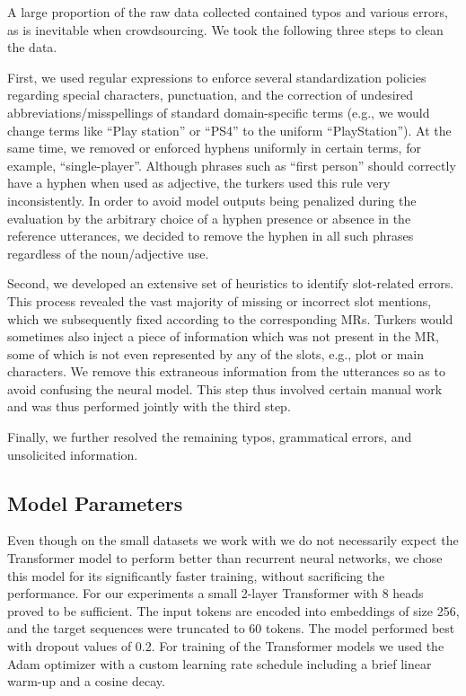 \documentclass[11pt,a4paper]{article}
\begin{document}
A large proportion of the raw data collected contained typos and various errors, as is inevitable when crowdsourcing. We took the following three steps to clean the data.

First, we used regular expressions to enforce several standardization policies regarding special characters, punctuation, and the correction of undesired abbreviations/misspellings of standard domain-specific terms (e.g., we would change terms like ``Play station'' or ``PS4'' to the uniform ``PlayStation''). At the same time, we removed or enforced hyphens uniformly in certain terms, for example, ``single-player''. Although phrases such as ``first person'' should correctly have a hyphen when used as adjective, the turkers used this rule very inconsistently. In order to avoid model outputs being penalized during the evaluation by the arbitrary choice of a hyphen presence or absence in the reference utterances, we decided to remove the hyphen in all such phrases regardless of the noun/adjective use.


Second, we developed an extensive set of heuristics to identify slot-related errors. This process revealed the vast majority of missing or incorrect slot mentions, which we subsequently fixed according to the corresponding MRs. Turkers would sometimes also inject a piece of information which was not present in the MR, some of which is not even represented by any of the slots, e.g., plot or main characters. We remove this extraneous information from the utterances so as to avoid confusing the neural model. This step thus involved certain manual work and was thus performed jointly with the third step.

Finally, we further resolved the remaining typos, grammatical errors, and unsolicited information.












\subsection{Model Parameters}

Even though on the small datasets we work with we do not necessarily expect the Transformer model to perform better than recurrent neural networks, we chose this model for its significantly faster training, without sacrificing the performance. For our experiments a small 2-layer Transformer with 8 heads proved to be sufficient. The input tokens are encoded into embeddings of size 256, and the target sequences were truncated to 60 tokens. The model performed best with dropout values of 0.2. For training of the Transformer models we used the Adam optimizer with a custom learning rate schedule including a brief linear warm-up and a cosine decay.
\end{document}
